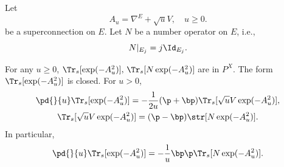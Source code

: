 Let 
\[
A_u=\nabla^E+\sqrt{u}V,\quad u\geq0.
\]
be a superconnection on $E$. Let $N$ be a number operator on $E$,
i.e., 
\[
N|_{E_j}=j\Id_{E_j}.
\] 
\begin{theorem}
    For any $u\geq0$, $\Tr_s[\exp(-A_u^2)],\,\Tr_s[N\exp(-A_u^2)]$
    are in $P^X$. The form $\Tr_s[\exp(-A_u^2)]$ is closed. 
    For $u>0$, 
    \begin{gather}
    \pd{}{u}\Tr_s[\exp(-A_u^2)] = 
    -\frac{1}{2u}(\p+\bp)\Tr_s[\sqrt{u}V\exp(-A_u^2)],\label{eq:3.1} \\
    \Tr_s[\sqrt{u}V\exp(-A_u^2)] = 
    (\p-\bp)\str[N\exp(-A_u^2)].\label{eq:3.2}
    \end{gather}
    In particular, 
    \begin{equation}\label{eq:3.3}
        \pd{}{u}\Tr_s[\exp(-A_u^2)] = 
        -\frac{1}{u}\bp\p\Tr_s[N\exp(-A_u^2)].
    \end{equation}
\end{theorem}

